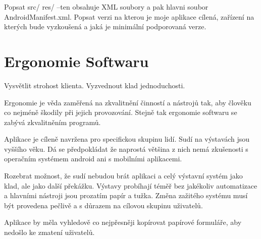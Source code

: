 \documentclass[11pt, oneside]{fithesis2}
\begin{document}
Popsat src/ res/ --ten obsahuje XML soubory a pak hlavni soubor AndroidManifest.xml.
Popsat verzi na kterou je moje aplikace cílená, zařízení na kterých bude vyzkoušená a jaká je minimální podporovaná verze.

\chapter{Ergonomie Softwaru}
Vysvětlit strohost klienta. Vyzvednout klad jednoduchosti.
\linebreak

Ergonomie je věda zaměřená na zkvalitnění činností a nástrojů tak, aby člověku co nejméně škodily při jejich provozování.
Stejně tak ergonomie softwaru se zabývá zkvalitněním programů.
\linebreak

Aplikace je cíleně navržena pro specifickou skupinu lidí. Sudí na výstavách jsou vyššího věku. Dá se předpokládat že naprostá většina z nich nemá zkušenosti s operačním systémem android ani s mobilními aplikacemi.

Rozebrat možnost, že sudí nebudou brát aplikaci a celý výstavní systém jako klad, ale jako další překážku.
Výstavy probíhají téměř bez jakékoliv automatizace a hlavními nástroji jsou prozatím papír a tužka. Změna zažitého systému musí být provedena pečlivě a s důrazem na cílovou skupinu uživatelů.

Aplikace by měla vyhledově co nejpřesněji kopírovat papírové formuláře, aby nedošlo ke zmatení uživatelů.
\end{document}
